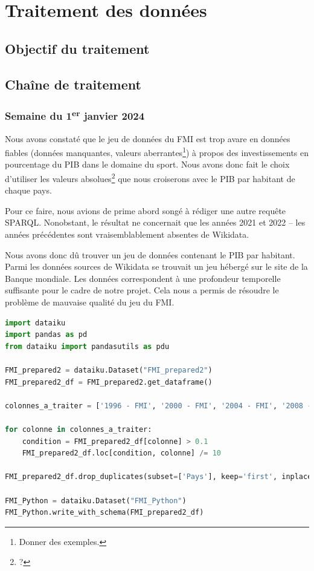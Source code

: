 \documentclass[hidelinks, 12pt]{article}
\begin{document}
\section{Traitement des données}
	
\subsection{Objectif du traitement}
		
\subsection{Chaîne de traitement}

\subsubsection{Semaine du 1\textsuperscript{er} janvier 2024}
		
Nous avons constaté que le jeu de données du FMI est trop avare en données fiables (données manquantes, valeurs aberrantes\footnote{Donner des exemples.}) à propos des investissements en pourcentage du PIB dans le domaine du sport. Nous avons donc fait le choix d'utiliser les valeurs absolues\footnote{?} que nous croiserons avec le PIB par habitant de chaque pays.
		
Pour ce faire, nous avions de prime abord songé à rédiger une autre requête SPARQL. Nonobstant, le résultat ne concernait que les années 2021 et 2022 -- les années précédentes sont vraisemblablement absentes de Wikidata.
		
\label{banquemondiale}Nous avons donc dû trouver un jeu de données contenant le PIB par habitant. Parmi les données sources de Wikidata se trouvait un jeu hébergé sur le site de la Banque mondiale. Les données correspondent à une profondeur temporelle suffisante pour le cadre de notre projet. Cela nous a permis de résoudre le problème de mauvaise qualité du jeu du FMI.



\begin{lstlisting}[language=python]
import dataiku
import pandas as pd
from dataiku import pandasutils as pdu

FMI_prepared2 = dataiku.Dataset("FMI_prepared2")
FMI_prepared2_df = FMI_prepared2.get_dataframe()

colonnes_a_traiter = ['1996 - FMI', '2000 - FMI', '2004 - FMI', '2008 - FMI', '2012 - FMI', '2016 - FMI']

for colonne in colonnes_a_traiter:
	condition = FMI_prepared2_df[colonne] > 0.1
	FMI_prepared2_df.loc[condition, colonne] /= 10

FMI_prepared2_df.drop_duplicates(subset=['Pays'], keep='first', inplace=True)

FMI_Python = dataiku.Dataset("FMI_Python")
FMI_Python.write_with_schema(FMI_prepared2_df)
\end{lstlisting}
\end{document}
